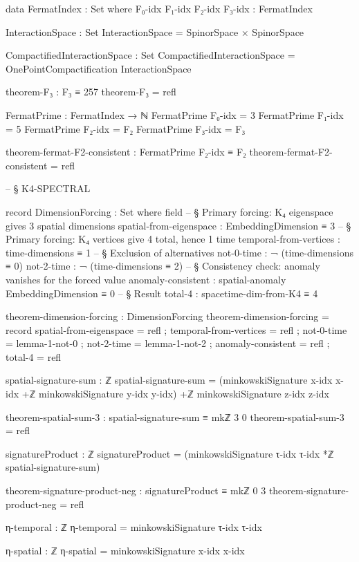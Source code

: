 \documentclass[11pt,a4paper]{book}
\begin{document}
\begin{code}
data FermatIndex : Set where
  F₀-idx F₁-idx F₂-idx F₃-idx : FermatIndex

InteractionSpace : Set
InteractionSpace = SpinorSpace × SpinorSpace

CompactifiedInteractionSpace : Set
CompactifiedInteractionSpace = OnePointCompactification InteractionSpace

theorem-F₃ : F₃ ≡ 257
theorem-F₃ = refl

FermatPrime : FermatIndex → ℕ
FermatPrime F₀-idx = 3
FermatPrime F₁-idx = 5
FermatPrime F₂-idx = F₂
FermatPrime F₃-idx = F₃

theorem-fermat-F2-consistent : FermatPrime F₂-idx ≡ F₂
theorem-fermat-F2-consistent = refl


-- § K4-SPECTRAL

record DimensionForcing : Set where
  field
    -- § Primary forcing: K₄ eigenspace gives 3 spatial dimensions
    spatial-from-eigenspace : EmbeddingDimension ≡ 3
    -- § Primary forcing: K₄ vertices give 4 total, hence 1 time
    temporal-from-vertices  : time-dimensions ≡ 1
    -- § Exclusion of alternatives
    not-0-time  : ¬ (time-dimensions ≡ 0)
    not-2-time  : ¬ (time-dimensions ≡ 2)
    -- § Consistency check: anomaly vanishes for the forced value
    anomaly-consistent : spatial-anomaly EmbeddingDimension ≡ 0
    -- § Result
    total-4 : spacetime-dim-from-K4 ≡ 4

theorem-dimension-forcing : DimensionForcing
theorem-dimension-forcing = record
  { spatial-from-eigenspace = refl
  ; temporal-from-vertices  = refl
  ; not-0-time              = lemma-1-not-0
  ; not-2-time              = lemma-1-not-2
  ; anomaly-consistent      = refl
  ; total-4                 = refl
  }

spatial-signature-sum : ℤ
spatial-signature-sum = (minkowskiSignature x-idx x-idx +ℤ
                         minkowskiSignature y-idx y-idx) +ℤ
                         minkowskiSignature z-idx z-idx

theorem-spatial-sum-3 : spatial-signature-sum ≡ mkℤ 3 0
theorem-spatial-sum-3 = refl

signatureProduct : ℤ
signatureProduct = (minkowskiSignature τ-idx τ-idx *ℤ spatial-signature-sum)

theorem-signature-product-neg : signatureProduct ≡ mkℤ 0 3
theorem-signature-product-neg = refl

η-temporal : ℤ
η-temporal = minkowskiSignature τ-idx τ-idx

η-spatial : ℤ
η-spatial = minkowskiSignature x-idx x-idx


\end{code}
\end{document}
